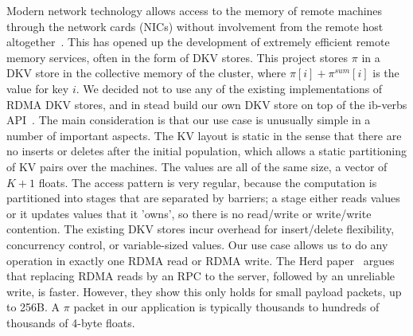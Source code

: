 Modern network technology allows access to the memory of remote machines
through the network cards (NICs) without involvement from the remote host
altogether~\cite{Hamada_infinibandtrade,RDMA,Beck:2011:PER:2043535.2043537}. This has opened up the development of
extremely efficient remote memory services, often in the form of DKV stores.
This project stores $\pi$ in a DKV store in the collective memory of the
cluster, where $\pi[i]+\pi^{sum}[i]$ is the value for key $i$. We decided not
to use any of the existing implementations of RDMA DKV stores, and in stead
build our own DKV store on top of the ib-verbs API~\cite{ib-verbs}. The
main consideration is that our use case is unusually simple in a number
of important aspects. The KV layout is static in the sense that there are
no inserts or deletes after the initial population, which allows a static
partitioning of KV pairs over the machines. The values are all of the same size,
a vector of $K+1$ floats. The access pattern is very regular, because the
computation is partitioned into stages that are separated by barriers; a
stage either reads values or it updates values that it 'owns', so there
is no read/write or write/write contention. The existing DKV stores incur
overhead for insert/delete flexibility, concurrency control, or variable-sized
values. Our use case allows us to do any operation in exactly one RDMA read
or RDMA write. The Herd paper~\cite{Herd} argues that replacing RDMA reads by
an RPC to the server, followed by an unreliable write, is faster. However,
they show this only holds for small payload packets, up to 256B. A $\pi$
packet in our application is typically thousands to hundreds of thousands
of 4-byte floats.
